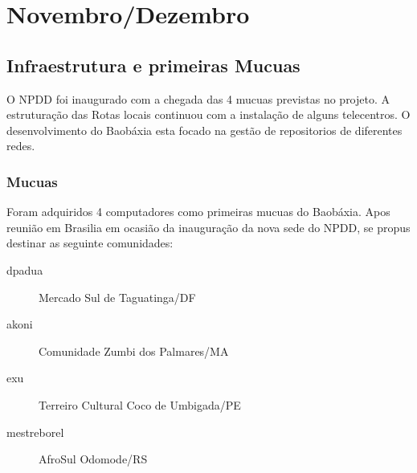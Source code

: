 \documentclass[a4paper, 11pt, oneside]{Relatorio_sem}  %
\begin{document}



\part{Novembro/Dezembro}
\chapter{Infraestrutura e primeiras Mucuas}
O NPDD foi inaugurado com a chegada das 4 mucuas previstas no
projeto. A estruturação das Rotas locais continuou com a instalação de
alguns telecentros. O desenvolvimento do Baobáxia esta focado na
gestão de repositorios de diferentes redes.

\section{Mucuas}
Foram adquiridos 4 computadores como primeiras mucuas do
Baobáxia. Apos reunião em Brasilia em ocasião da inauguração da nova
sede do NPDD, se propus destinar as seguinte comunidades:
\begin{description}
  \item[dpadua] Mercado Sul de Taguatinga/DF
  \item[akoni] Comunidade Zumbi dos Palmares/MA 
  \item[exu] Terreiro Cultural Coco de Umbigada/PE
  \item[mestreborel] AfroSul Odomode/RS
\end{description}
\end{document}
